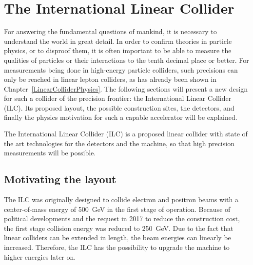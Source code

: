 \chapter{The International Linear Collider}
\label{ILC}
\begin{chapterabstract}
For answering the fundamental questions of mankind, it is necessary to understand the world in great detail.
In order to confirm theories in particle physics, or to disproof them, it is often important to be able to measure the qualities of particles or their interactions to the tenth decimal place or better.
For measurements being done in high-energy particle colliders, such precisions can only be reached in linear lepton colliders, as has already been shown in Chapter~\ref{LinearColliderPhysics}.
The following sections will present a new design for such a collider of the precision frontier: the International Linear Collider (ILC). 
Its proposed layout, the possible construction sites, the detectors, and finally the physics motivation for such a capable accelerator will be explained.
\end{chapterabstract}
\newline

The International Linear Collider (ILC) is a proposed linear \positron\electron collider with state of the art technologies for the detectors and the machine, so that high precision measurements will be possible.

\section{Motivating the layout}
\label{ILC:layout}
The ILC was originally designed to collide electron and positron beams with a center-of-mass energy of \SI{500}{\GeV} in the first stage of operation.
Because of political developments and the request in 2017 to reduce the construction cost, the first stage collision energy was reduced to \SI{250}{\GeV}.
Due to the fact that linear colliders can be extended in length, the beam energies can linearly be increased.
Therefore, the ILC has the possibility to upgrade the machine to higher energies later on.

